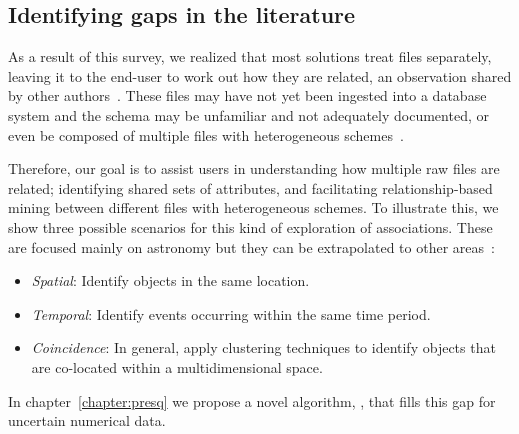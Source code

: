 \subsection{Identifying gaps in the literature}
\label{sec:mapping/gaps}

As a result of this survey, we realized that most solutions treat files
separately, leaving it to the end-user to work out how they are related,
an observation shared by other authors~\cite{Silva2016}.
These files may have not yet been ingested into a database system and 
the schema may be unfamiliar and not adequately documented, or even be
composed of multiple files with heterogeneous schemes~\cite{alawini2016,zhang2015astronomy}.

Therefore, our goal is to assist users in understanding how multiple raw files are related;
identifying shared sets of attributes, and facilitating
relationship-based mining between different files with heterogeneous schemes.
To illustrate this, we show three possible scenarios for this kind of
exploration of associations.
These are focused mainly on astronomy but they can be extrapolated to other areas~\cite{Borne2001}:

\begin{itemize}
    \item \emph{Spatial}: Identify objects in the same location.
    \item \emph{Temporal}: Identify events occurring within the same time period.
    \item \emph{Coincidence}: In general, apply clustering techniques to
    identify objects that are co-located within a multidimensional space.
\end{itemize}

In chapter~\ref{chapter:presq} we propose a novel algorithm, \PresQ, that fills this gap for
uncertain numerical data.
